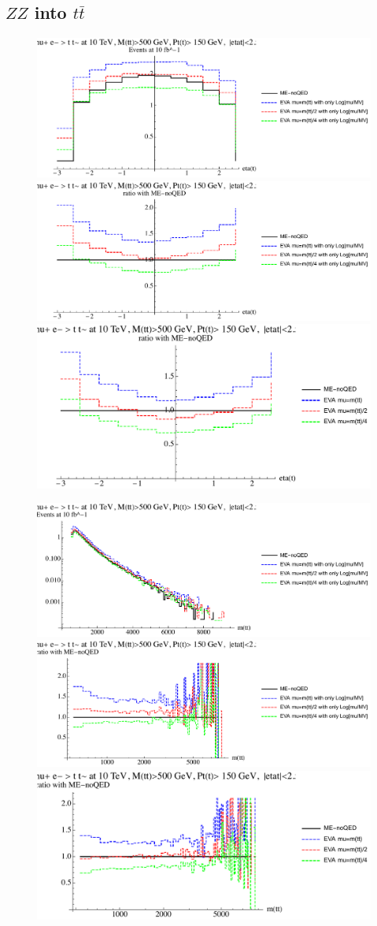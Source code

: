 \documentclass[a4paper,11pt]{article}
\begin{document}
\clearpage
\subsection{$ZZ$ into $t \bar t$}

\begin{figure}[ht]
\includegraphics[width=0.46\linewidth]{PlotDistr/ZZ_tt/10TeVcuts/plotetat.pdf}
\includegraphics[width=0.46\linewidth]{PlotDistr/ZZ_tt/10TeVcuts/plotetatratio1.pdf}
\includegraphics[width=0.46\linewidth]{PlotDistr/ZZ_tt/10TeVcuts/plotetatratio2.pdf}
\end{figure}

\begin{figure}[ht]
\includegraphics[width=0.46\linewidth]{PlotDistr/ZZ_tt/10TeVcuts/plotmtt.pdf}
\includegraphics[width=0.46\linewidth]{PlotDistr/ZZ_tt/10TeVcuts/plotmttratio1.pdf}
\includegraphics[width=0.46\linewidth]{PlotDistr/ZZ_tt/10TeVcuts/plotmttratio2.pdf}
\end{figure}
\end{document}
